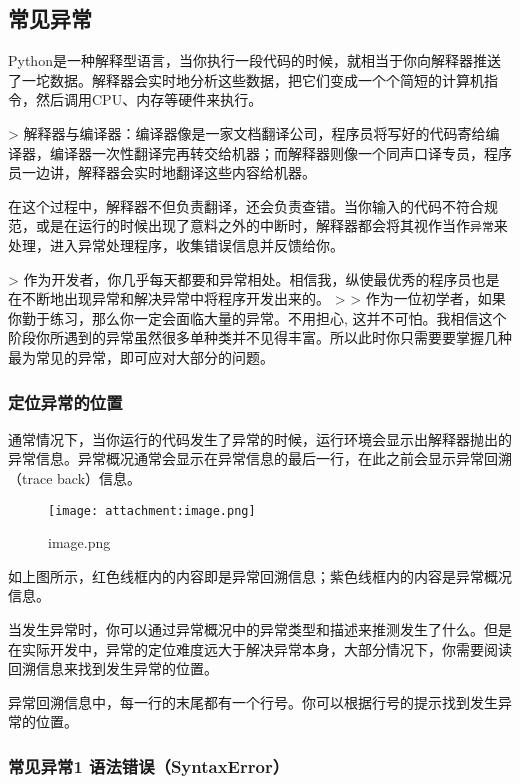 \documentclass[11pt]{article}
\makeatletter
\def\maxwidth{\ifdim\Gin@nat@width>\linewidth\linewidth
    \else\Gin@nat@width\fi}
\let\Oldincludegraphics\includegraphics
\renewcommand{\includegraphics}[1]{\Oldincludegraphics[width=.8\maxwidth]{#1}}
\makeatother
\begin{document}
    \subsection{常见异常}\label{ux5e38ux89c1ux5f02ux5e38}

Python是一种解释型语言，当你执行一段代码的时候，就相当于你向解释器推送了一坨数据。解释器会实时地分析这些数据，把它们变成一个个简短的计算机指令，然后调用CPU、内存等硬件来执行。

\textgreater{}
解释器与编译器：编译器像是一家文档翻译公司，程序员将写好的代码寄给编译器，编译器一次性翻译完再转交给机器；而解释器则像一个同声口译专员，程序员一边讲，解释器会实时地翻译这些内容给机器。

在这个过程中，解释器不但负责翻译，还会负责查错。当你输入的代码不符合规范，或是在运行的时候出现了意料之外的中断时，解释器都会将其视作当作\texttt{异常}来处理，进入异常处理程序，收集错误信息并反馈给你。

\textgreater{}
作为开发者，你几乎每天都要和异常相处。相信我，纵使最优秀的程序员也是在不断地出现异常和解决异常中将程序开发出来的。
\textgreater{} \textgreater{}
作为一位初学者，如果你勤于练习，那么你一定会面临大量的异常。不用担心,
这并不可怕。我相信这个阶段你所遇到的异常虽然很多单种类并不见得丰富。所以此时你只需要要掌握几种最为常见的异常，即可应对大部分的问题。

    \subsubsection{定位异常的位置}\label{ux5b9aux4f4dux5f02ux5e38ux7684ux4f4dux7f6e}

通常情况下，当你运行的代码发生了异常的时候，运行环境会显示出解释器抛出的异常信息。异常概况通常会显示在异常信息的最后一行，在此之前会显示异常回溯（trace
back）信息。

\begin{figure}[htbp]
\centering
\texttt{[image: attachment:image.png]}
\caption{image.png}
\end{figure}

如上图所示，红色线框内的内容即是异常回溯信息；紫色线框内的内容是异常概况信息。

当发生异常时，你可以通过异常概况中的异常类型和描述来推测发生了什么。但是在实际开发中，异常的定位难度远大于解决异常本身，大部分情况下，你需要阅读回溯信息来找到发生异常的位置。

异常回溯信息中，每一行的末尾都有一个行号。你可以根据行号的提示找到发生异常的位置。

    \subsubsection{常见异常1
语法错误（SyntaxError）}\label{ux5e38ux89c1ux5f02ux5e381-ux8bedux6cd5ux9519ux8befsyntaxerror}
\end{document}
